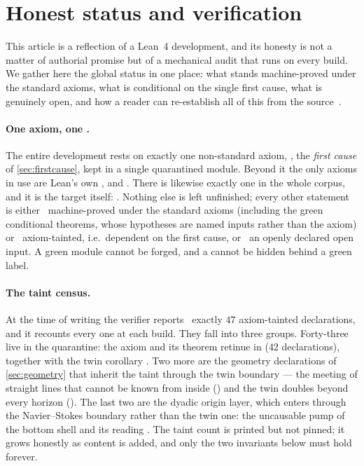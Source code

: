 \section{Honest status and verification}\label{sec:status}

This article is a reflection of a Lean~4 development, and its honesty is not a matter of
authorial promise but of a mechanical audit that runs on every build. We gather here the global
status in one place: what stands machine-proved under the standard axioms, what is conditional on
the single first cause, what is genuinely open, and how a reader can re-establish all of this from
the source~\cite{lean4,mathlib,euclidspath-repo}.

\paragraph{One axiom, one .}
The entire development rests on exactly one non-standard axiom, \axiom{}, the \emph{first cause}
of \cref{sec:firstcause}, kept in a single quarantined module. Beyond it the only axioms in use are
Lean's own ,  and . There is likewise exactly
one  in the whole corpus, and it is the target itself:
. Nothing else is left unfinished; every other statement is either
\green{}~machine-proved under the standard axioms (including the green conditional theorems, whose
hypotheses are named inputs rather than the axiom) or \yellow{}~axiom-tainted, i.e.\ dependent on
the first cause, or \red{}~an openly declared open input. A green module cannot be forged, and a
 cannot be hidden behind a green label.

\paragraph{The taint census.}
At the time of writing the verifier reports \yellow{}~exactly $47$ axiom-tainted declarations, and
it recounts every one at each build. They fall into three groups. Forty-three live in the
quarantine: the axiom \axiom{} and its theorem retinue in 
($42$ declarations), together with the twin corollary . Two
more are the geometry declarations of \cref{sec:geometry} that inherit the taint through the twin
boundary --- the meeting of straight lines that cannot be known from inside
() and the twin doubles beyond every horizon
(). The last two are the dyadic origin layer, which
enters through the Navier--Stokes boundary rather than the twin one: the uncausable pump of the
bottom shell and its reading . The taint count is
printed but not pinned; it grows honestly as content is added, and only the two invariants below
must hold forever.


